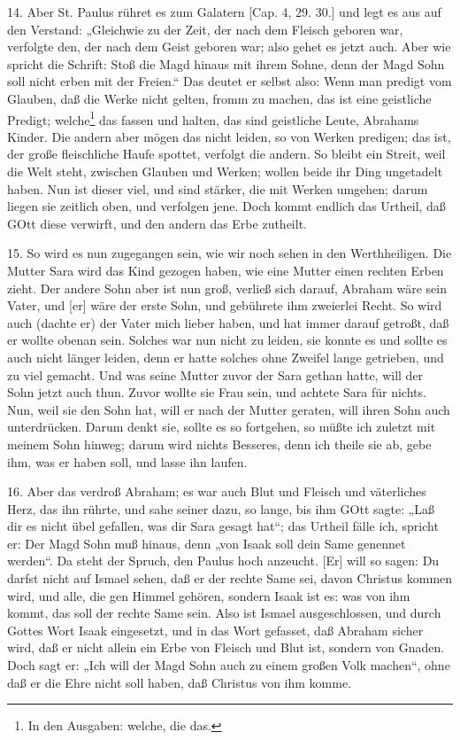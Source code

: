 14. Aber St. Paulus rühret es zum Galatern [Cap. 4, 29. 30.] und legt es aus auf den Verstand: „Gleichwie zu der Zeit, der nach dem Fleisch geboren war, verfolgte den, der nach dem Geist geboren war; also gehet es jetzt auch. Aber wie spricht die Schrift: Stoß die Magd hinaus mit ihrem Sohne, denn der Magd Sohn soll nicht erben mit der Freien.“ Das deutet er selbst also: Wenn man predigt vom Glauben, daß die Werke nicht gelten, fromm zu machen, das ist eine geistliche Predigt; welche\footnote{In den Ausgaben: welche, die das.} das fassen und halten, das sind geistliche Leute, Abrahams Kinder. Die andern aber mögen das nicht leiden, so von Werken predigen; das ist, der große fleischliche Haufe spottet, verfolgt die andern. So bleibt ein Streit, weil die Welt steht, zwischen Glauben und Werken; wollen beide ihr Ding ungetadelt haben. Nun ist dieser viel, und sind stärker, die mit Werken umgehen; darum liegen sie zeitlich oben, und verfolgen jene. Doch kommt endlich das Urtheil, daß GOtt diese verwirft, und den andern das Erbe zutheilt.

15. So wird es nun zugegangen sein, wie wir noch sehen in den Werthheiligen. Die Mutter Sara wird das Kind gezogen haben, wie eine Mutter einen rechten Erben zieht. Der andere Sohn aber ist nun groß, verließ sich darauf, Abraham wäre sein Vater, und [er] wäre der erste Sohn, und gebührete ihm zweierlei Recht. So wird auch (dachte er) der Vater mich lieber haben, und hat immer darauf getroßt, daß er wollte obenan sein. Solches war nun nicht zu leiden, sie konnte es und sollte es auch nicht länger leiden, denn er hatte solches ohne Zweifel lange getrieben, und zu viel gemacht. Und was seine Mutter zuvor der Sara gethan hatte, will der Sohn jetzt auch thun. Zuvor wollte sie Frau sein, und achtete Sara für nichts. Nun, weil sie den Sohn hat, will er nach der Mutter geraten, will ihren Sohn auch unterdrücken. Darum denkt sie, sollte es so fortgehen, so müßte ich zuletzt mit meinem Sohn hinweg; darum wird nichts Besseres, denn ich theile sie ab, gebe ihm, was er haben soll, und lasse ihn laufen.

16. Aber das verdroß Abraham; es war auch Blut und Fleisch und väterliches Herz, das ihn rührte, und sahe seiner dazu, so lange, bis ihm GOtt sagte: „Laß dir es nicht übel gefallen, was dir Sara gesagt hat“; das Urtheil fälle ich, spricht er: Der Magd Sohn muß hinaus, denn „von Isaak soll dein Same genennet werden“. Da steht der Spruch, den Paulus hoch anzeucht. [Er] will so sagen: Du darfst nicht auf Ismael sehen, daß er der rechte Same sei, davon Christus kommen wird, und alle, die gen Himmel gehören, sondern Isaak ist es: was von ihm kommt, das soll der rechte Same sein. Also ist Ismael ausgeschlossen, und durch Gottes Wort Isaak eingesetzt, und in das Wort gefasset, daß Abraham sicher wird, daß er nicht allein ein Erbe von Fleisch und Blut ist, sondern von Gnaden. Doch sagt er: „Ich will der Magd Sohn auch zu einem großen Volk machen“, ohne daß er die Ehre nicht soll haben, daß Christus von ihm komme.

